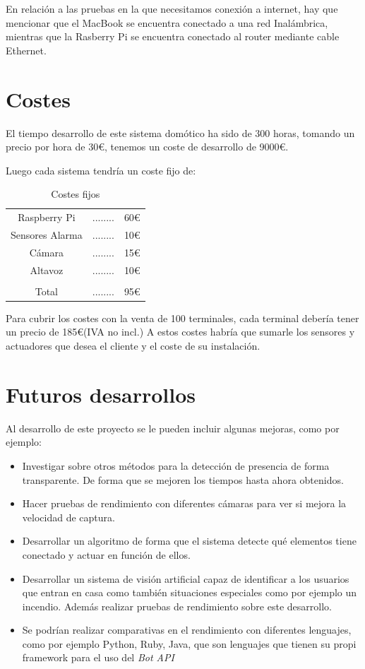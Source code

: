 \documentclass[10pt,journal,compsoc]{IEEEtran}
\begin{document}
En relación a las pruebas en la que necesitamos conexión a internet, 
hay que mencionar que el MacBook se encuentra conectado a una red Inalámbrica, 
mientras que la Rasberry Pi se encuentra conectado al router mediante cable Ethernet. 

\section{Costes}
El tiempo desarrollo de este sistema domótico ha sido de 300 horas, tomando un 
precio por hora de 30\euro, tenemos un coste de desarrollo de 9000\euro.

Luego cada sistema tendría un coste fijo de:
\begin{table}[h]
\centering
\begin{tabular}{ccc}
Raspberry Pi & ........ & 60\euro \\
Sensores Alarma & ........ & 10\euro \\
Cámara & ........ & 15\euro \\
Altavoz & ........ & 10\euro \\
\hline \\
Total & ........ & 95\euro \\
\end{tabular} 
\caption{Costes fijos}
\label{tab:CostesFij}
\end{table}

Para cubrir los costes con la venta de 100 terminales, cada terminal debería tener un precio de 
185\euro (IVA no incl.)
A estos costes habría que sumarle los sensores y actuadores que desea el cliente y el coste 
de su instalación.

\section{Futuros desarrollos}
Al desarrollo de este proyecto se le pueden incluir algunas mejoras, como por 
ejemplo:
\begin{itemize}
  \item Investigar sobre otros métodos para la detección de presencia de forma 
  transparente. De forma que se mejoren los tiempos hasta ahora obtenidos.
  \item Hacer pruebas de rendimiento con diferentes cámaras para ver si mejora 
  la velocidad de captura.
  \item Desarrollar un algoritmo de forma que el sistema detecte qué elementos 
  tiene conectado y actuar en función de ellos.
  \item Desarrollar un sistema de visión artificial capaz de identificar a los usuarios 
  que entran en casa como también situaciones especiales como por ejemplo un 
  incendio. Además realizar pruebas de rendimiento sobre este desarrollo.
  \item Se podrían realizar comparativas en el rendimiento con diferentes 
  lenguajes, como por ejemplo Python, Ruby, Java, que son lenguajes que tienen 
  su propi framework para el uso del \textit{Bot API}
\end{itemize}
\end{document}

